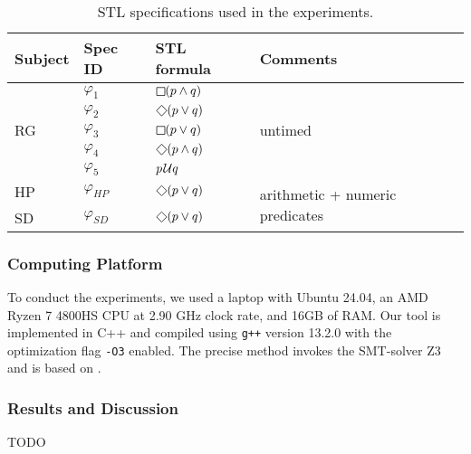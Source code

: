 \begin{table}
\centering
\begin{tabular}{|l|l|l|l|}
\hline
Subject & Spec ID & STL formula & Comments \\
\hline
\multirow{ 5}{*}{RG} & $\varphi_1$ & $\LTLg (p \wedge q)$ & \multirow{ 5}{*}{untimed} \\
& $\varphi_2$ & $\LTLf (p \vee q)$ & \\
& $\varphi_3$ & $\LTLg (p \vee q)$ & \\
& $\varphi_4$ & $\LTLf (p \wedge q)$ & \\
& $\varphi_5$ & $p \kern.1em\mathcal{U} q$ & \\
\hline
HP & $\varphi_{HP}$ & $\LTLf (p \vee q)$ & \multirow{ 2}{*}{arithmetic + numeric predicates} \\
SD & $\varphi_{SD}$ & $\LTLf (p \vee q)$ &  \\
\hline
\end{tabular}
\caption{STL specifications used in the experiments.}
\label{tab:spec} 
\end{table}

\subsubsection{Computing Platform}

To conduct the experiments, we used a laptop with Ubuntu 24.04, an AMD Ryzen 7 4800HS CPU at 2.90 GHz clock rate, and 16GB of RAM.
Our tool is implemented in C++ and compiled using \texttt{g++} version 13.2.0 with the optimization flag \texttt{-O3} enabled.
The precise method invokes the SMT-solver Z3 \cite{MouraB08} and is based on \cite{MomtazAB23}.

\subsubsection{Results and Discussion}
\alert{TODO}